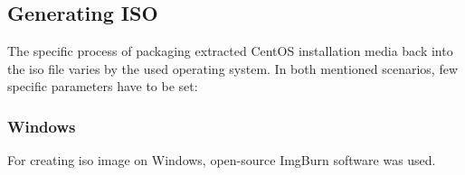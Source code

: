 \documentclass[
  printed, %
  table,   %
  lof,     %
  lot,     %
           oneside, color
]{fithesis3}
\renewcommand{\texttt}[1]{%
  \begingroup
  \ttfamily
  \begingroup\lccode`~=`/\lowercase{\endgroup\def~}{/\discretionary{}{}{}}%
  \begingroup\lccode`~=`[\lowercase{\endgroup\def~}{[\discretionary{}{}{}}%
  \begingroup\lccode`~=`.\lowercase{\endgroup\def~}{.\discretionary{}{}{}}%
  \catcode`/=\active\catcode`[=\active\catcode`.=\active
  \scantokens{#1\noexpand}%
  \endgroup
}
\begin{document}
\subsection{Generating ISO}
The specific process of packaging extracted CentOS installation media back into the iso file varies by the used operating system. In both mentioned scenarios, few specific parameters have to be set:
\subsubsection{Windows}
For creating iso image on Windows, open-source ImgBurn software was used. 
\end{document}
